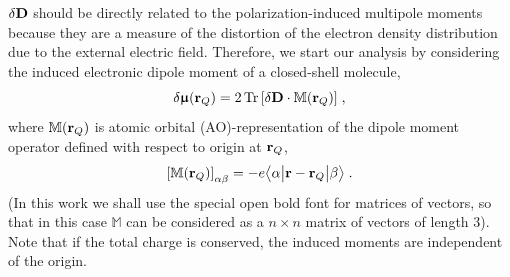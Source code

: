 \documentclass[aip,amsmath,amssymb,reprint,floatfix]{revtex4-1}
\newcommand{\tbraket}[3]{\ensuremath{\bigl\langle {#1} \bigl\lvert {#2} \bigl\lvert {#3} \bigr\rangle}}
\newcommand{\BM}[1]{\bm{#1}}
\DeclareMathOperator{\Tr}{Tr}
\begin{document}
$\delta {\bf D}$ should 
be directly related to the
polarization\hyp{}induced multipole moments because they are
a measure of the distortion of the electron density distribution due to the external electric
field. 
Therefore, 
we start our analysis by considering the induced electronic dipole moment 
of a closed-shell molecule, 
%
\begin{equation} \label{e:dmu-exact}
 \delta {\BM{\upmu}}({\bf r}_Q) = 
     2 \Tr{ 
         \left[ 
              \delta {\bf D} \cdot {\mathbb{M}({\bf r}_Q)}
         \right] } \;,
\end{equation}
%
where ${\mathbb{M}({\bf r}_Q)}$ is atomic orbital (AO)\hyp{}representation
of the dipole moment operator defined with respect to origin at ${\bf r}_Q$,
%
\begin{equation}\label{e:m}
 \left[ {\mathbb{M}({\bf r}_Q)} \right]_{\alpha\beta} = -e\tbraket{\alpha}{{\bf r} - {\bf r}_Q}{\beta} \;.
\end{equation}
%
(In this work we shall use the special open bold font for matrices of vectors, so that
in this case ${\mathbb{M}}$ can be considered as a $n \times n$ matrix of vectors of length 3).
Note that if the total charge is conserved, the induced moments are independent of the origin.
\end{document}
